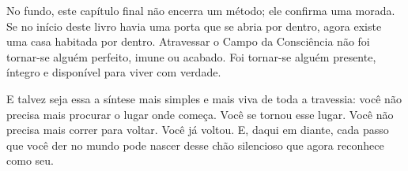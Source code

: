 \documentclass[12pt]{book}
\begin{document}
No fundo, este capítulo final não encerra um método; ele confirma uma morada. Se no início deste livro havia uma porta que se abria por dentro, agora existe uma casa habitada por dentro. Atravessar o Campo da Consciência não foi tornar-se alguém perfeito, imune ou acabado. Foi tornar-se alguém presente, íntegro e disponível para viver com verdade.

E talvez seja essa a síntese mais simples e mais viva de toda a travessia: você não precisa mais procurar o lugar onde começa. Você se tornou esse lugar. Você não precisa mais correr para voltar. Você já voltou. E, daqui em diante, cada passo que você der no mundo pode nascer desse chão silencioso que agora reconhece como seu.
\end{document}
